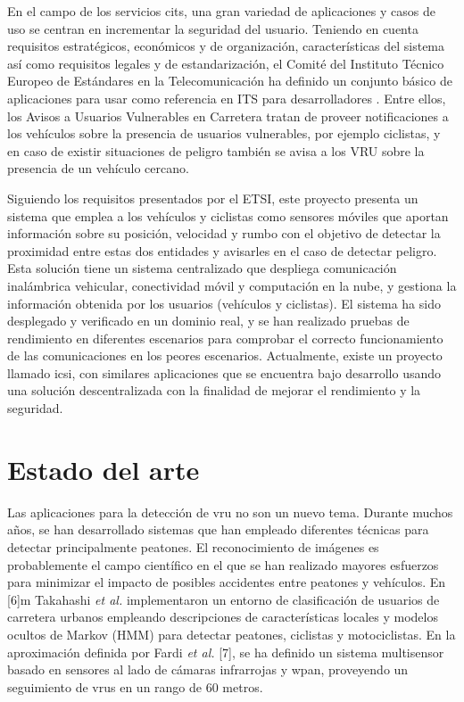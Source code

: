 En el campo de los servicios \gls{cits}, una gran variedad de aplicaciones y casos de uso se centran en incrementar la seguridad del usuario. Teniendo en cuenta requisitos estratégicos, económicos y de organización, características del sistema así como requisitos legales y de estandarización, el Comité del Instituto Técnico Europeo de Estándares en la Telecomunicación ha definido un conjunto básico de aplicaciones para usar como referencia en ITS para desarrolladores \cite{6}. Entre ellos, los Avisos a Usuarios Vulnerables en Carretera tratan de proveer notificaciones a los vehículos sobre la presencia de usuarios vulnerables, por ejemplo ciclistas, y en caso de existir situaciones de peligro también se avisa a los VRU sobre la presencia de un vehículo cercano.

Siguiendo los requisitos presentados por el ETSI, este proyecto presenta un sistema que emplea a los vehículos y ciclistas como sensores móviles que aportan información sobre su posición, velocidad y rumbo con el objetivo de detectar la proximidad entre estas dos entidades y avisarles en el caso de detectar peligro. Esta solución tiene un sistema centralizado que despliega comunicación inalámbrica vehicular, conectividad móvil y computación en la nube, y gestiona la información obtenida por los usuarios (vehículos y ciclistas). El sistema ha sido desplegado y verificado en un dominio real, y se han realizado pruebas de rendimiento en diferentes escenarios para comprobar el correcto funcionamiento de las comunicaciones en los peores escenarios. Actualmente, existe un proyecto llamado \gls{icsi}, con similares aplicaciones que se encuentra bajo desarrollo usando una solución descentralizada con la finalidad de mejorar el rendimiento y la seguridad.

\section{Estado del arte}\label{section:antecedentes}
Las aplicaciones para la detección de \gls{vru} no son un nuevo tema. Durante muchos años, se han desarrollado sistemas que han empleado diferentes técnicas para detectar principalmente peatones. El reconocimiento de imágenes es probablemente el campo científico en el que se han realizado mayores esfuerzos para minimizar el impacto de posibles accidentes entre peatones y vehículos. En [6]m Takahashi \emph{et al.} implementaron un entorno de clasificación de usuarios de carretera urbanos empleando descripciones de características locales y modelos ocultos de Markov (HMM) para detectar peatones, ciclistas y motociclistas. En la aproximación definida por Fardi \emph{et al.} [7], se ha definido un sistema multisensor basado en sensores al lado de cámaras infrarrojas y \gls{wpan}, proveyendo un seguimiento de \gls{vru}s en un rango de 60 metros.


